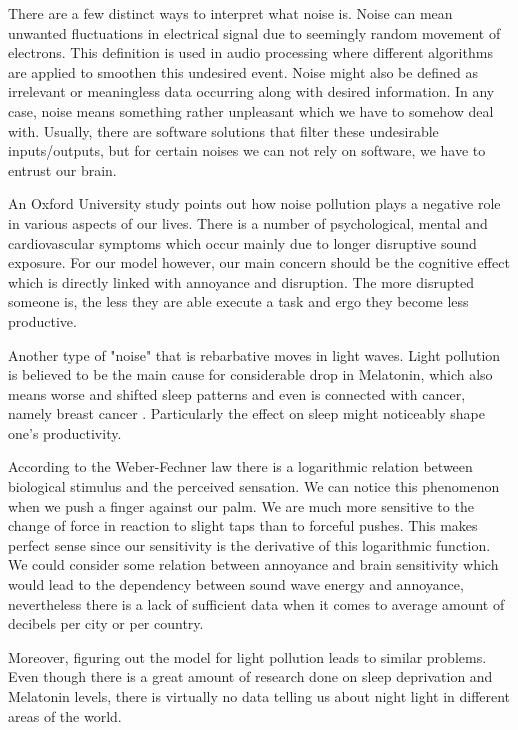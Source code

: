 There are a few distinct ways to interpret what noise is. Noise can mean unwanted fluctuations in electrical signal due to seemingly random movement of electrons. This definition is used in audio processing where different algorithms are applied to smoothen this undesired event. Noise might also be defined as irrelevant or meaningless data occurring along with desired information. In any case, noise means something rather unpleasant which we have to somehow deal with. Usually, there are software solutions that filter these undesirable inputs/outputs, but for certain noises we can not rely on software, we have to entrust our brain.


An Oxford University study \cite{Stansfeld2003} points out how noise pollution plays a negative role in various aspects of our lives. There is a number of psychological, mental and cardiovascular symptoms which occur mainly due to longer disruptive sound exposure. For our model however, our main concern should be the cognitive effect which is directly linked with annoyance and disruption. The more disrupted someone is, the less they are able execute a task and ergo they become less productive. 


Another type of "noise" that is rebarbative moves in light waves. Light pollution is believed to be the main cause for considerable drop in Melatonin, which also means worse and shifted sleep patterns and even is connected with cancer, namely breast cancer \cite{Chepesiuk2009}. Particularly the effect on sleep might noticeably shape one's productivity.


According to the Weber-Fechner law there is a logarithmic relation between biological stimulus and the perceived sensation. We can notice this phenomenon when we push a finger against our palm. We are much more sensitive to the change of force in reaction to slight taps than to forceful pushes. This makes perfect sense since our sensitivity is the derivative of this logarithmic function. We could consider some relation between annoyance and brain sensitivity which would lead to the dependency between sound wave energy and annoyance, nevertheless there is a lack of sufficient data when it comes to average amount of decibels per city or per country. 


Moreover, figuring out the model for light pollution leads to similar problems. Even though there is a great amount of research done on sleep deprivation and Melatonin levels, there is virtually no data telling us about night light in different areas of the world. 


